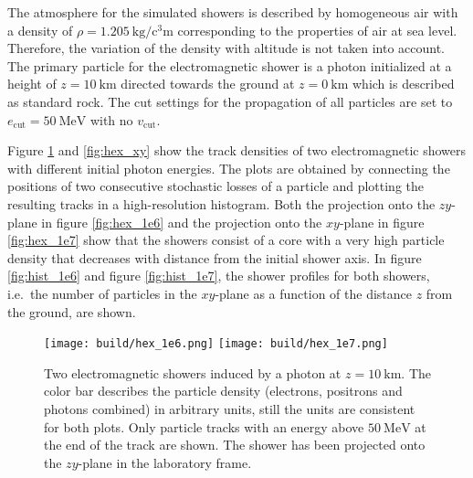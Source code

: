 The atmosphere for the simulated showers is described by homogeneous air with a density of $\rho = \SI{1.205}{\kilo\gram\per\cubic\centi\metre}$ corresponding to the properties of air at sea level.
Therefore, the variation of the density with altitude is not taken into account.
The primary particle for the electromagnetic shower is a photon initialized at a height of $z = \SI{10}{\kilo\metre}$ directed towards the ground at $z=\SI{0}{\kilo\metre}$ which is described as standard rock.
The cut settings for the propagation of all particles are set to $e_{\text{cut}} = \SI{50}{\mega\electronvolt}$ with no $v_{\text{cut}}$.

Figure \ref{fig:hex} and \ref{fig:hex_xy} show the track densities of two electromagnetic showers with different initial photon energies.
The plots are obtained by connecting the positions of two consecutive stochastic losses of a particle and plotting the resulting tracks in a high-resolution histogram.
Both the projection onto the $zy$-plane in figure \ref{fig:hex_1e6} and the projection onto the $xy$-plane in figure \ref{fig:hex_1e7} show that the showers consist of a core with a very high particle density that decreases with distance from the initial shower axis.
In figure \ref{fig:hist_1e6} and figure \ref{fig:hist_1e7}, the shower profiles for both showers, i.e.\ the number of particles in the $xy$-plane as a function of the distance $z$ from the ground, are shown.

\begin{figure}
      \centering
        {\texttt{[image: build/hex\_1e6.png]}}
        \hfill
        {\texttt{[image: build/hex\_1e7.png]}}
      \caption{Two electromagnetic showers induced by a photon at $z=\SI{10}{\kilo\metre}$. The color bar describes the particle density (electrons, positrons and photons combined) in arbitrary units, still the units are consistent for both plots. Only particle tracks with an energy above $\SI{50}{\mega\electronvolt}$ at the end of the track are shown. The shower has been projected onto the $zy$-plane in the laboratory frame.\label{fig:hex}}
\end{figure}

